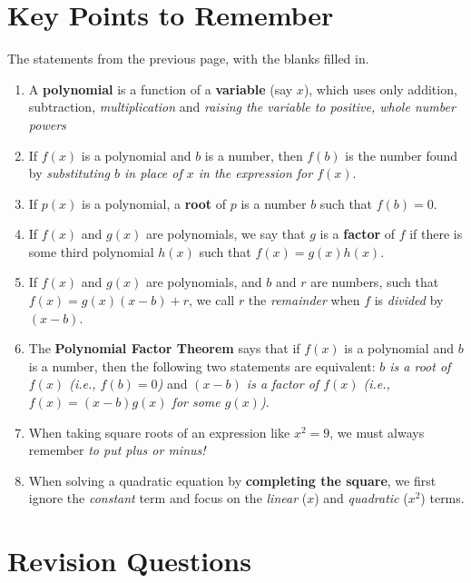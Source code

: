 \documentclass{article}
\begin{document}
\clearpage

\section{Key Points to Remember}

The statements from the previous page, with the blanks filled in.

\begin{enumerate}
\item A {\bf polynomial} is a function of a {\bf variable} (say $x$), which uses only addition, subtraction, \textit{multiplication} and \textit{raising the variable to positive, whole number powers}
\item If $f(x)$ is a polynomial and $b$ is a number, then $f(b)$ is the number found by \textit{substituting $b$ in place of $x$ in the expression for $f(x)$}.
\item If $p(x)$ is a polynomial, a {\bf root} of $p$ is a number $b$ such that $f(b)=0$.
\item If $f(x)$ and $g(x)$ are polynomials, we say that $g$ is a {\bf factor} of $f$ if there is some third polynomial $h(x)$ such that $f(x)=g(x)h(x)$.
\item If $f(x)$ and $g(x)$ are polynomials, and $b$ and $r$ are numbers, such that $f(x)=g(x)(x-b)+r$, we call $r$ the \textit{remainder} when $f$ is \textit{divided} by $(x-b)$.
\item The {\bf Polynomial Factor Theorem} says that if $f(x)$ is a polynomial and $b$ is a number, then the following two statements are equivalent: \textit{$b$ is a root of $f(x)$ (i.e., $f(b)=0$)} and \textit{$(x-b)$ is a factor of $f(x)$ (i.e., $f(x)=(x-b)g(x)$ for some $g(x)$)}.
\item When taking square roots of an expression like $x^2=9$, we must always remember \textit{to put plus or minus!}
\item When solving a quadratic equation by {\bf completing the square}, we first ignore the \textit{constant} term and focus on the \textit{linear} ($x$) and \textit{quadratic} ($x^2$) terms.
\end{enumerate}


\clearpage

\section{Revision Questions}
\end{document}
